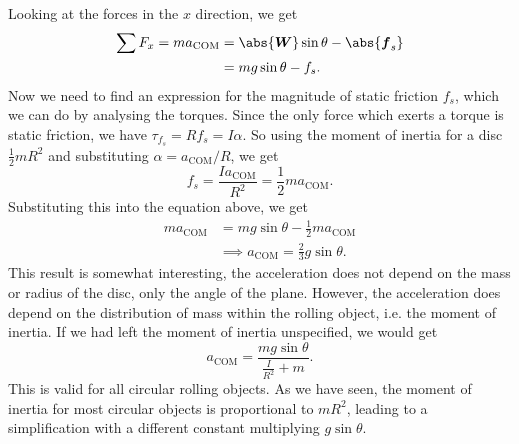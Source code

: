 \documentclass[../classical_mechanics.tex]{subfiles}
\begin{document}
\begin{example}
                Looking at the forces in the $x$ direction, we get
                \begin{align}
                    \sum F_x=m a_\text{COM}&=\abs{\vec{W}}\sin\theta-\abs{\vec{f}_s}\\
                    &=mg\sin\theta-f_s.
                \end{align}
                Now we need to find an expression for the magnitude of static friction $f_s$, which we can do by analysing the torques.
                Since the only force which exerts a torque is static friction, we have $\tau_{f_s}=Rf_s=I\alpha$.
                So using the moment of inertia for a disc $\frac{1}{2}mR^2$ and substituting $\alpha=a_\text{COM}/R$, we get
                \begin{equation}
                    f_s=\frac{I a_\text{COM}}{R^2}=\frac{1}{2}ma_\text{COM}.
                \end{equation}
                Substituting this into the equation above, we get
                \begin{align}
                    ma_\text{COM}&=mg\sin\theta-\frac{1}{2}ma_\text{COM}\\
                    &\implies a_\text{COM}=\frac{2}{3}g\sin\theta.
                \end{align}
                This result is somewhat interesting, the acceleration does not depend on the mass or radius of the disc, only the angle of the plane.
                However, the acceleration does depend on the distribution of mass within the rolling object, i.e. the moment of inertia.
                If we had left the moment of inertia unspecified, we would get
                \begin{equation}
                    a_\text{COM}=\frac{mg\sin\theta}{\frac{I}{R^2}+m}.
                \end{equation}
                This is valid for all circular rolling objects.
                As we have seen, the moment of inertia for most circular objects is proportional to $mR^2$, leading to a simplification with a different constant multiplying $g\sin\theta$.
            \end{example}
\end{document}
